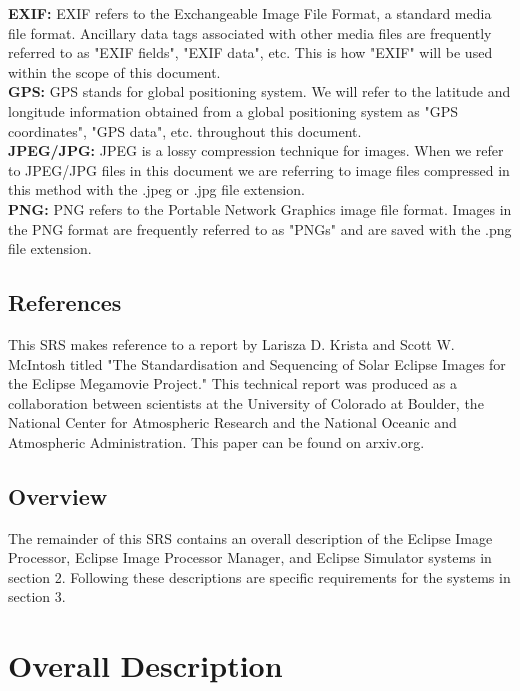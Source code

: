 \documentclass[10pt, onecolumn, draftclsnofoot, letterpaper, compsoc]{IEEEtran}
\begin{document}
	\noindent \textbf{EXIF:}
	EXIF refers to the Exchangeable Image File Format, a standard
	media file format. Ancillary data tags associated with other media
	files are frequently referred to as "EXIF fields", "EXIF data", etc.
	This is how "EXIF" will be used within the scope of this document. \\

	\noindent \textbf{GPS:}
	GPS stands for global positioning system. We will refer to the
	latitude and longitude information obtained from a global positioning
	system as "GPS coordinates", "GPS data", etc. throughout this document. \\

	\noindent \textbf{JPEG/JPG:}
	JPEG is a lossy compression technique for images. When we refer
	to JPEG/JPG files in this document we are referring to image files
	compressed in this method with the .jpeg or .jpg file extension. \\

	\noindent \textbf{PNG:}
	PNG refers to the Portable Network Graphics image file format.
	Images in the PNG format are frequently referred to as "PNGs" and are
	saved with the .png file extension.


\subsection{References}

This SRS makes reference to a report by Larisza D. Krista and Scott W.
McIntosh titled "The Standardisation and Sequencing of Solar Eclipse Images for
the Eclipse Megamovie Project." This technical report was produced as a
collaboration between scientists at the University of Colorado at Boulder, the
National Center for Atmospheric Research and the National Oceanic and
Atmospheric Administration. This paper can be found on arxiv.org.

\subsection{Overview}

The remainder of this SRS contains an overall description of the Eclipse Image
Processor, Eclipse Image Processor Manager, and Eclipse Simulator systems in
section 2. Following these descriptions are specific requirements for the
systems in section 3.

\newpage
\section{Overall Description}
\end{document}
